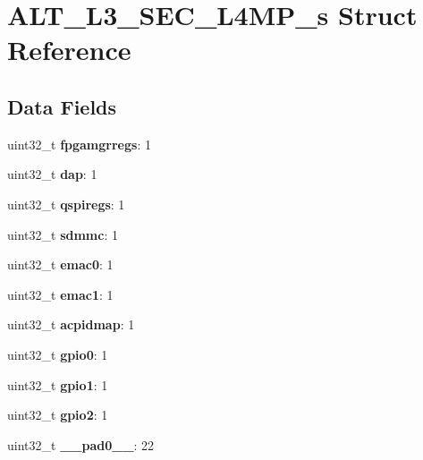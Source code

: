 \hypertarget{structALT__L3__SEC__L4MP__s}{}\section{A\+L\+T\+\_\+\+L3\+\_\+\+S\+E\+C\+\_\+\+L4\+M\+P\+\_\+s Struct Reference}
\label{structALT__L3__SEC__L4MP__s}
\subsection*{Data Fields}
\begin{DoxyCompactItemize}
\item 
\mbox{\label{structALT__L3__SEC__L4MP__s_a6c40c2b68572e826f48f0ff771fd4cc9}} 
uint32\+\_\+t {\bfseries fpgamgrregs}\+: 1
\item 
\mbox{\label{structALT__L3__SEC__L4MP__s_a44e7967c65cd7ac6970acd8de0b7ae4b}} 
uint32\+\_\+t {\bfseries dap}\+: 1
\item 
\mbox{\label{structALT__L3__SEC__L4MP__s_aa64e6c1d1e0a46bf3a2128fa05fa93ff}} 
uint32\+\_\+t {\bfseries qspiregs}\+: 1
\item 
\mbox{\label{structALT__L3__SEC__L4MP__s_ad8a2deb0ad37271d998b93bd55f732bf}} 
uint32\+\_\+t {\bfseries sdmmc}\+: 1
\item 
\mbox{\label{structALT__L3__SEC__L4MP__s_abc3d0544e3ce4bbccf728d461f8b0f36}} 
uint32\+\_\+t {\bfseries emac0}\+: 1
\item 
\mbox{\label{structALT__L3__SEC__L4MP__s_a8e7711d3fa23da7e30ea4b107bd46208}} 
uint32\+\_\+t {\bfseries emac1}\+: 1
\item 
\mbox{\label{structALT__L3__SEC__L4MP__s_a5689bfce89312cbb54e2221f032d8c17}} 
uint32\+\_\+t {\bfseries acpidmap}\+: 1
\item 
\mbox{\label{structALT__L3__SEC__L4MP__s_a5950ab4866557ed647f9c682c158aba3}} 
uint32\+\_\+t {\bfseries gpio0}\+: 1
\item 
\mbox{\label{structALT__L3__SEC__L4MP__s_a3fdea552aab24258e42084015217f9a9}} 
uint32\+\_\+t {\bfseries gpio1}\+: 1
\item 
\mbox{\label{structALT__L3__SEC__L4MP__s_abafb2ede546528cd5895c874448a8766}} 
uint32\+\_\+t {\bfseries gpio2}\+: 1
\item 
\mbox{\label{structALT__L3__SEC__L4MP__s_a7304df61641dbd1e0f30b5cd336b710b}} 
uint32\+\_\+t {\bfseries \+\_\+\+\_\+pad0\+\_\+\+\_\+}\+: 22
\end{DoxyCompactItemize}


